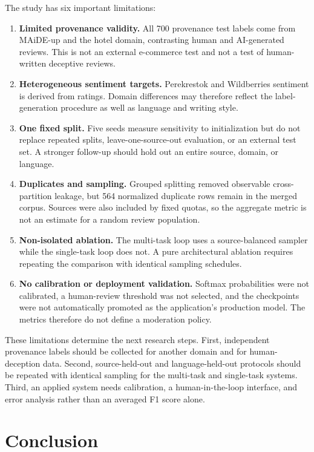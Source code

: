 \documentclass[11pt,a4paper]{article}
\begin{document}
The study has six important limitations:
\begin{enumerate}[leftmargin=0.65cm]
  \item \textbf{Limited provenance validity.} All 700 provenance test labels come from MAiDE-up and the hotel domain, contrasting human and AI-generated reviews. This is not an external e-commerce test and not a test of human-written deceptive reviews.
  \item \textbf{Heterogeneous sentiment targets.} Perekrestok and Wildberries sentiment is derived from ratings. Domain differences may therefore reflect the label-generation procedure as well as language and writing style.
  \item \textbf{One fixed split.} Five seeds measure sensitivity to initialization but do not replace repeated splits, leave-one-source-out evaluation, or an external test set. A stronger follow-up should hold out an entire source, domain, or language.
  \item \textbf{Duplicates and sampling.} Grouped splitting removed observable cross-partition leakage, but 564 normalized duplicate rows remain in the merged corpus. Sources were also included by fixed quotas, so the aggregate metric is not an estimate for a random review population.
  \item \textbf{Non-isolated ablation.} The multi-task loop uses a source-balanced sampler while the single-task loop does not. A pure architectural ablation requires repeating the comparison with identical sampling schedules.
  \item \textbf{No calibration or deployment validation.} Softmax probabilities were not calibrated, a human-review threshold was not selected, and the checkpoints were not automatically promoted as the application's production model. The metrics therefore do not define a moderation policy.
\end{enumerate}

These limitations determine the next research steps. First, independent provenance labels should be collected for another domain and for human-deception data. Second, source-held-out and language-held-out protocols should be repeated with identical sampling for the multi-task and single-task systems. Third, an applied system needs calibration, a human-in-the-loop interface, and error analysis rather than an averaged F1 score alone.

\section{Conclusion}
\end{document}
